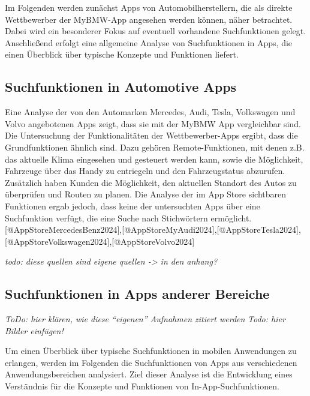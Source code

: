\documentclass[
  12pt,
  a4paperpaper,
]{report}
\begin{document}
Im Folgenden werden zunächst Apps von Automobilherstellern, die als
direkte Wettbewerber der MyBMW-App angesehen werden können, näher
betrachtet. Dabei wird ein besonderer Fokus auf eventuell vorhandene
Suchfunktionen gelegt. Anschließend erfolgt eine allgemeine Analyse von
Suchfunktionen in Apps, die einen Überblick über typische Konzepte und
Funktionen liefert.

\subsection{Suchfunktionen in Automotive
Apps}\label{suchfunktionen-in-automotive-apps}

Eine Analyse der von den Automarken Mercedes, Audi, Tesla, Volkswagen
und Volvo angebotenen Apps zeigt, dass sie mit der MyBMW App
vergleichbar sind. Die Untersuchung der Funktionalitäten der
Wettbewerber-Apps ergibt, dass die Grundfunktionen ähnlich sind. Dazu
gehören Remote-Funktionen, mit denen z.B. das aktuelle Klima eingesehen
und gesteuert werden kann, sowie die Möglichkeit, Fahrzeuge über das
Handy zu entriegeln und den Fahrzeugstatus abzurufen. Zusätzlich haben
Kunden die Möglichkeit, den aktuellen Standort des Autos zu überprüfen
und Routen zu planen. Die Analyse der im App Store sichtbaren Funktionen
ergab jedoch, dass keine der untersuchten Apps über eine Suchfunktion
verfügt, die eine Suche nach Stichwörtern ermöglicht.
{[}@AppStoreMercedesBenz2024{]},{[}@AppStoreMyAudi2024{]},{[}@AppStoreTesla2024{]},{[}@AppStoreVolkswagen2024{]},{[}@AppStoreVolvo2024{]}

\emph{todo: diese quellen sind eigene quellen -\textgreater{} in den
anhang?}

\subsection{Suchfunktionen in Apps anderer
Bereiche}\label{suchfunktionen-in-apps-anderer-bereiche}

\emph{ToDo: hier klären, wie diese ``eigenen'' Aufnahmen zitiert werden}
\emph{Todo: hier Bilder einfügen!}

Um einen Überblick über typische Suchfunktionen in mobilen Anwendungen
zu erlangen, werden im Folgenden die Suchfunktionen von Apps aus
verschiedenen Anwendungsbereichen analysiert. Ziel dieser Analyse ist
die Entwicklung eines Verständnis für die Konzepte und Funktionen von
In-App-Suchfunktionen.
\end{document}
